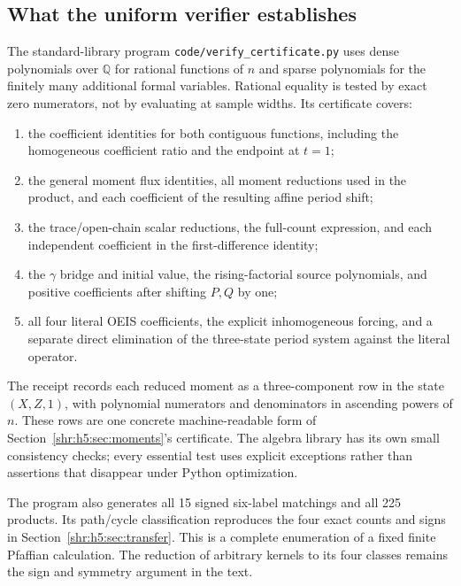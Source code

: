 \documentclass[11pt,letterpaper]{article}
\numberwithin{equation}{section}
\theoremstyle{definition}
\newcommand{\Q}{\mathbb Q}
\newcommand{\1}{\mathbf 1}
\begin{document}
\subsection{What the uniform verifier establishes}
The standard-library program \texttt{code/verify\_certificate.py}
uses dense polynomials over $\Q$ for rational functions of $n$ and sparse
polynomials for the finitely many additional formal variables. Rational
equality is tested by exact zero numerators, not by evaluating at sample
widths. Its certificate covers:
\begin{enumerate}
\item the coefficient identities for both contiguous functions, including
the homogeneous coefficient ratio and the endpoint at $t=1$;
\item the general moment flux identities, all moment reductions used in
the product, and each coefficient of the resulting affine period shift;
\item the trace/open-chain scalar reductions, the full-count expression,
and each independent coefficient in the first-difference identity;
\item the $\gamma$ bridge and initial value, the rising-factorial source
polynomials, and positive coefficients after shifting $P,Q$ by one;
\item all four literal OEIS coefficients, the explicit inhomogeneous
forcing, and a separate direct elimination of the three-state period
system against the literal operator.
\end{enumerate}
The receipt records each reduced moment as a three-component row in the
state $(X,Z,1)$, with polynomial numerators and denominators in ascending
powers of $n$. These rows are one concrete machine-readable form of
Section~\ref{shr:h5:sec:moments}'s certificate. The algebra library has its own
small consistency checks; every essential test uses explicit exceptions
rather than assertions that disappear under Python optimization.

The program also generates all 15 signed six-label matchings and all 225
products. Its path/cycle classification reproduces the four exact counts
and signs in Section~\ref{shr:h5:sec:transfer}. This is a complete enumeration of
a fixed finite Pfaffian calculation. The reduction of arbitrary kernels
to its four classes remains the sign and symmetry argument in the text.
\end{document}
